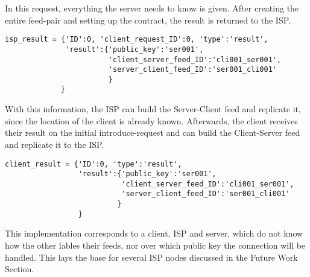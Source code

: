 In this request, everything the server needs to know is given. After creating the entire feed-pair and setting up the contract, the result is returned to the ISP.
\\
\begin{lstlisting}
isp_result = {'ID':0, 'client_request_ID':0, 'type':'result', 
              'result':{'public_key':'ser001', 
                        'client_server_feed_ID':'cli001_ser001',
                        'server_client_feed_ID':'ser001_cli001'
                        }
             }
\end{lstlisting}
With this information, the ISP can build the Server-Client feed and replicate it, since the location of the client is already known.
Afterwards, the client receives their result on the initial introduce-request and can build the Client-Server feed and replicate it to the ISP.\\
\begin{lstlisting}
client_result = {'ID':0, 'type':'result', 
                 'result':{'public_key':'ser001', 
                           'client_server_feed_ID':'cli001_ser001', 
                           'server_client_feed_ID':'ser001_cli001'
                          }
                 }
\end{lstlisting}
This implementation corresponds to a client, ISP and server, which do not know how the other lables their feeds, nor over which public key the connection will be handled. This lays the base for several ISP nodes discussed in the Future Work Section. 


